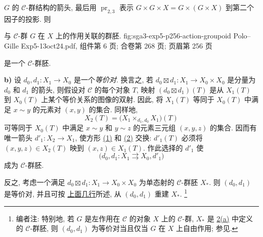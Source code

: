 
\(G\) 的 \(\mathscr C\)-群结构的箭头, 最后用
\(\operatorname{pr}_{2,3}\) 表示
\(G\times G\times X=G\times(G\times X)\) 到第二个因子的投影. 则

  {与 \(\mathscr C\)-群 \(G\) 在 \(X\) 上的作用关联的群胚.}
  {fig:sga3-exp5-p256-action-groupoid}
  {Polo--Gille Exp5-13oct24.pdf, 组件第 6 页; 合卷第 268 页; 页眉第 256 页}

\noindent 是一个 \(\mathscr C\)-群胚.

\medskip
{}\label{par:sga3-V-2-b}%
\noindent\textbf{b)} 设 \(d_0,d_1:X_1\to X_0\) 是一个\emph{等价对}.
换言之, 若 \(d_0\boxtimes d_1:X_1\to X_0\times X_0\)
是分量为 \(d_0\) 和 \(d_1\) 的箭头, 则假设对
\(\mathscr C\) 的每个对象 \(T\), 映射 \((d_0\boxtimes d_1)(T)\)
是从 \(X_1(T)\) 到 \(X_0(T)\) 上某个等价关系的图像的双射.
因此, 将 \(X_1(T)\) 等同于 \(X_0(T)\) 中满足 \(x\sim y\)
的元素对 \((x,y)\) 的集合. 同样地,
\[
  X_2(T)=\bigl(X_1\times_{d_1,d_0}X_1\bigr)(T)
\]
可等同于 \(X_0(T)\) 中满足 \(x\sim y\) 和 \(y\sim z\)
的元素三元组 \((x,y,z)\) 的集合. 因而有唯一箭头
\(d'_1:X_2\to X_1\), 使方形
\hyperref[sga3:v:lemma:1-2:equation:1]{(1)} 和
\hyperref[sga3:v:lemma:1-2:equation:2]{(2)} 交换:
\(d'_1(T)\) 必须将 \((x,y,z)\in X_2(T)\) 映到 \((x,z)\in X_1(T)\).
作此选择的 \(d'_1\) 使
\[
  \bigl(d_0,d_1:X_1\rightrightarrows X_0,d'_1\bigr)
\]
成为 \(\mathscr C\)-群胚.

反之, 考虑一个满足 \(d_0\boxtimes d_1:X_1\to X_0\times X_0\)
为单态射的 \(\mathscr C\)-群胚 \(X_\ast\).
则 \((d_0,d_1)\) 是等价对, 并且可按
\hyperref[par:sga3-V-2-b]{上面几行}所述, 从 \((d_0,d_1)\)
重建 \(X_\ast\).%
\footnote{\label{note:sga3-V-9}编者注: 特别地, 若 \(G\)
是左作用在 \(\mathscr C\) 的对象 \(X\) 上的 \(\mathscr C\)-群,
\(X_\ast\) 是 \hyperref[par:sga3-V-2-a]{2(a)} 中定义的
\(\mathscr C\)-群胚, 则 \((d_0,d_1)\) 为等价对当且仅当
\(G\) 在 \(X\) 上自由作用; 参见.}

